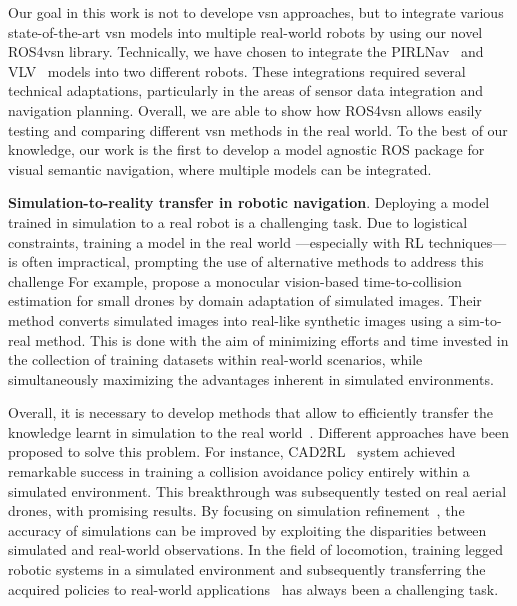 Our goal in this work is not to develope \acrshort{vsn} approaches, but to integrate various state-of-the-art \acrshort{vsn} models into multiple real-world robots by using our novel ROS4\acrshort{vsn} library.
Technically, we have chosen to integrate the PIRLNav~\cite{ramrakhya2023} and VLV~\cite{chang2020} models into two different robots.
These integrations required several technical adaptations, particularly in the areas of sensor data integration and navigation planning.
Overall, we are able to show how ROS4\acrshort{vsn} allows easily testing and comparing different \acrshort{vsn} methods in the real world.
To the best of our knowledge, our work is the first to develop a model agnostic ROS package for visual semantic navigation, where multiple models can be integrated.

\textbf{Simulation-to-reality transfer in robotic navigation}.
Deploying a model trained in simulation to a real robot is a challenging task.
Due to logistical constraints, training a model in the real world —especially with RL techniques— is often impractical, prompting the use of alternative methods to address this challenge
For example, \cite{kim2022} propose a monocular vision-based time-to-collision estimation for small drones by domain adaptation of simulated images.
Their method converts simulated images into real-like synthetic images using a sim-to-real method.
This is done with the aim of minimizing efforts and time invested in the collection of training datasets within real-world scenarios, while simultaneously maximizing the advantages inherent in simulated environments.

Overall, it is necessary to develop methods that allow to efficiently transfer the knowledge learnt in simulation to the real world~\cite{kadian2020}.
Different approaches have been proposed to solve this problem.
For instance, CAD2RL~\cite{sadeghiCAD2RLRealSingleImage2017} system achieved remarkable success in training a collision avoidance policy entirely within a simulated environment.
This breakthrough was subsequently tested on real aerial drones, with promising results.
By focusing on simulation refinement~\cite{Son2020}, the accuracy of simulations can be improved by exploiting the disparities between simulated and real-world observations.
In the field of locomotion, training legged robotic systems in a simulated environment and subsequently transferring the acquired policies to real-world applications~\cite{Hwangbo_2019, agarwal2022} has always been a challenging task.

